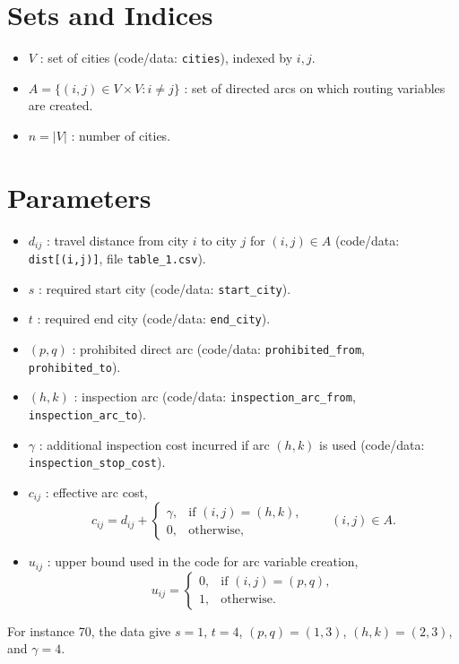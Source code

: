 \section*{Sets and Indices}

\begin{itemize}
\item $V$ : set of cities (code/data: \texttt{cities}), indexed by $i,j$.
\item $A=\{(i,j)\in V\times V : i\neq j\}$ : set of directed arcs on which routing variables are created.
\item $n = |V|$ : number of cities.
\end{itemize}

\section*{Parameters}

\begin{itemize}
\item $d_{ij}$ : travel distance from city $i$ to city $j$ for $(i,j)\in A$ (code/data: \texttt{dist[(i,j)]}, file \texttt{table\_1.csv}).
\item $s$ : required start city (code/data: \texttt{start\_city}).
\item $t$ : required end city (code/data: \texttt{end\_city}).
\item $(p,q)$ : prohibited direct arc (code/data: \texttt{prohibited\_from}, \texttt{prohibited\_to}).
\item $(h,k)$ : inspection arc (code/data: \texttt{inspection\_arc\_from}, \texttt{inspection\_arc\_to}).
\item $\gamma$ : additional inspection cost incurred if arc $(h,k)$ is used (code/data: \texttt{inspection\_stop\_cost}).
\item $c_{ij}$ : effective arc cost,
\[
c_{ij}=d_{ij}+\begin{cases}
\gamma, & \text{if } (i,j)=(h,k),\\
0, & \text{otherwise,}
\end{cases}
\qquad (i,j)\in A.
\]
\item $u_{ij}$ : upper bound used in the code for arc variable creation,
\[
u_{ij}=\begin{cases}
0, & \text{if } (i,j)=(p,q),\\
1, & \text{otherwise.}
\end{cases}
\]
\end{itemize}

For instance 70, the data give $s=1$, $t=4$, $(p,q)=(1,3)$, $(h,k)=(2,3)$, and $\gamma=4$.

